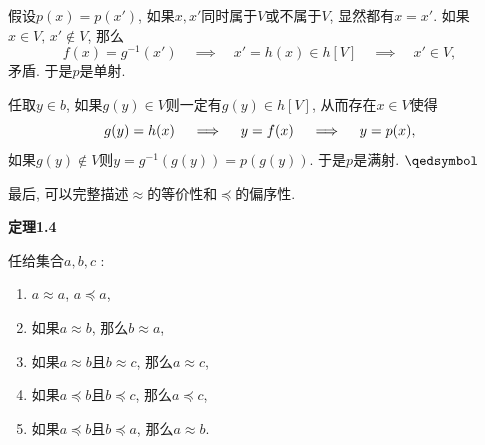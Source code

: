 \vspace{3pt}
假设$p(x)=p(x')$, 如果$x,x'$同时属于$V$或不属于$V$, 显然都有$x=x'$.
如果$x\in V,\,x'\notin V$, 那么
\[
    f(x)=g^{-1}(x')\quad\implies\quad x'=h(x)\in h[V]
    \quad\implies\quad x'\in V,
\]
矛盾. 于是$p$是单射.

\vspace{3pt}
任取$y\in b$, 如果$g(y)\in V$则一定有$g(y)\in h[V]$, 从而存在$x\in V$使得
\[
    g(y)=h(x)\quad\implies\quad y=f(x)\quad\implies\quad y=p(x),\\[3pt]
\]
如果$g(y)\notin V$则$y=g^{-1}(g(y))=p(g(y))$. 于是$p$是满射. \hfill $\qedsymbol$

\vspace{20pt}

最后, 可以完整描述$\approx$的等价性和$\preccurlyeq$的偏序性.

\vspace{10pt}

\hypertarget{sec:定理1.4}{}
\noindent\textbf{定理1.4}

任给集合$a,b,c$ :
\begin{enumerate}
    \item $a\approx a$, $a\preccurlyeq a$,
    \item 如果$a\approx b$, 那么$b\approx a$,
    \item 如果$a\approx b$且$b\approx c$, 那么$a\approx c$,
    \item 如果$a\preccurlyeq b$且$b\preccurlyeq c$, 那么$a\preccurlyeq c$,
    \item 如果$a\preccurlyeq b$且$b\preccurlyeq a$, 那么$a\approx b$.
\end{enumerate}

